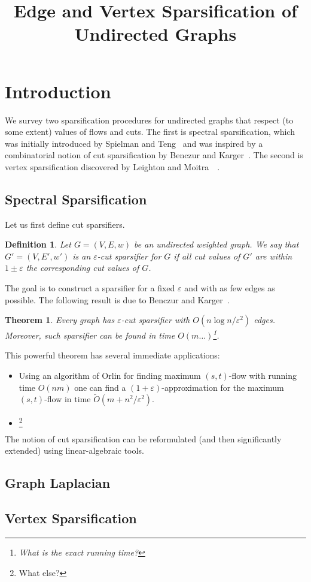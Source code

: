 \documentclass[12pt]{article}
\newcommand{\eps}{\varepsilon}
\newtheorem{theorem}{Theorem}
\newtheorem{definition}{Definition}
\begin{document}
    \title{Edge and Vertex Sparsification of Undirected Graphs}
    \date{}
    \maketitle

    \section{Introduction}
    We survey two sparsification procedures for undirected graphs that respect (to some extent) values of
    flows and cuts. The first is spectral sparsification, which was initially introduced by Spielman and Teng~\cite{} and was
    inspired by a combinatorial notion of cut sparsification by Benczur and Karger~\cite{}.
    The second is vertex sparsification discovered by Leighton and Moitra~\cite{}~\cite{}.
    \subsection{Spectral Sparsification}
    Let us first define cut sparsifiers.
    \begin{definition}
        Let $G = (V, E, w)$ be an undirected weighted graph.
        We say that $G' = (V, E', w')$ is an $\eps$-cut sparsifier for $G$ if all cut values of $G'$ are within
        $1 \pm \eps$ the corresponding cut values of $G$.
    \end{definition}
    The goal is to construct a sparsifier for a fixed $\eps$ and with as few edges as possible.
    The following result is due to Benczur and Karger~\cite{}.
    \begin{theorem}
        Every graph has $\eps$-cut sparsifier with $O(n \log n / \eps^2)$ edges.
        Moreover, such sparsifier can be found in time $O(m \ldots)$\footnote{What is the exact running time?}.
    \end{theorem}
    This powerful theorem has several immediate applications:
    \begin{itemize}
        \item Using an algorithm of Orlin for finding maximum $(s,t)$-flow with running time $O(nm)$ one can find a
        $(1 + \eps)$-approximation for the maximum $(s, t)$-flow in time $\tilde{O}(m + n^2 / \eps^2)$.
        \item\footnote{What else?}
    \end{itemize}
    The notion of cut sparsification can be reformulated (and then significantly extended) using linear-algebraic tools.
    \subsection{Graph Laplacian}
    \subsection{Vertex Sparsification}
\end{document}
